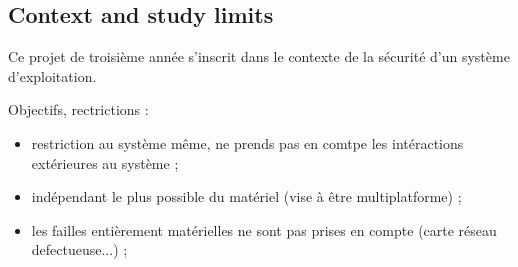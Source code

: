\documentclass[pdftex,a4paper,titlepage,11pt]{article}
\begin{document}
\subsection{Context and study limits}

Ce projet de troisième année s'inscrit dans le contexte de la sécurité d'un système d'exploitation.

Objectifs, rectrictions :
\begin{itemize}
	\item restriction au système même, ne prends pas en comtpe les intéractions extérieures au système ;
	\item indépendant le plus possible du matériel (vise à être multiplatforme) ;
	\item les failles entièrement matérielles ne sont pas prises en compte (carte réseau defectueuse...) ;
\end{itemize}



\end{document}
